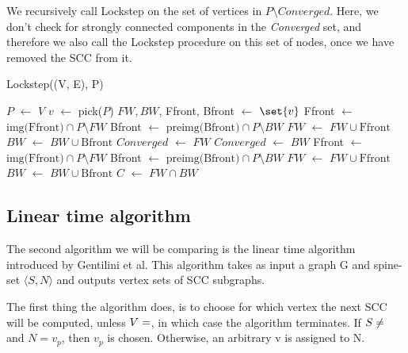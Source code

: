 \documentclass[../master/master.tex]{subfiles}
\newcommand*\Let[2]{\State #1 $\gets$ #2}
\begin{document}
We recursively call Lockstep on the set of vertices in $P\setminus Converged$. Here, we don't check for strongly connected components in the \emph{Converged} set, and therefore we also call the Lockstep procedure on this set of nodes, once we have removed the SCC from it.
\begin{algorithm}
  \caption{Lockstep((V, E), P)}
  \begin{algorithmic}[1]
    \Let{$P$}{$V$}
    \Statex
     \State \Return
    \EndIf
    \Statex
    \Let{$v$}{pick($P$)}
    \Let{$FW, BW$, Ffront, Bfront}{$\set{v}$}
    \Statex
     \Let{Ffront}{$\text{img(Ffront)}\cap P\setminus FW$}
     \Let{Bfront}{$\text{preimg(Bfront)}\cap P\setminus BW$}
     \Let{$FW$}{$FW\cup\text{Ffront}$}
     \Let{$BW$}{$BW\cup\text{Bfront}$}
    \EndWhile
    \Statex
     \Let{$Converged$}{$FW$}
    \Else
     \Let{$Converged$}{$BW$}
    \EndIf
    \Statex
     \Let{Ffront}{$\text{img(Ffront)}\cap P\setminus FW$}
     \Let{Bfront}{$\text{preimg(Bfront)}\cap P\setminus BW$}
     \Let{$FW$}{$FW\cup\text{Ffront}$}
     \Let{$BW$}{$BW\cup\text{Bfront}$}
    \EndWhile
    \Statex
    \Let{$C$}{$FW\cap BW$}
  \end{algorithmic}
\end{algorithm}

\subsection{Linear time algorithm}
The second algorithm we will be comparing is the linear time algorithm \cite{linear} introduced by Gentilini et al. This algorithm takes as input a graph G and spine-set $\langle S, N\rangle$ and outputs vertex sets of SCC subgraphs.

The first thing the algorithm does, is to choose for which vertex the next SCC will be computed, unless $V=\empty$, in which case the algorithm terminates. If $S\neq\empty$ and $N={v_p}$, then $v_p$ is chosen. Otherwise, an arbitrary v is assigned to N.
\end{document}
